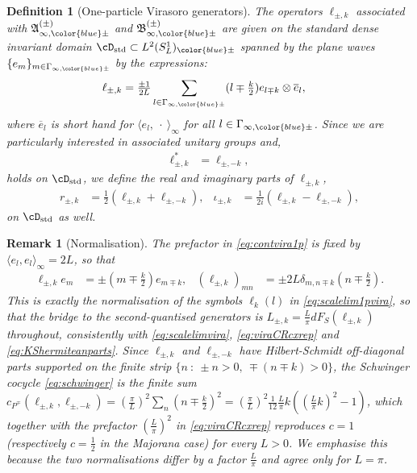 \documentclass[a4paper, 11pt]{article}
\newcommand{\fA}{\mathfrak{A}}\newcommand{\cA}{\mathcal{A}}\newcommand{\dA}{\mathds{A}}\newcommand{\sA}{\mathscr{A}}
\newcommand{\fB}{\mathfrak{B}}\newcommand{\cB}{\mathcal{B}}\newcommand{\dB}{\mathds{B}}\newcommand{\sB}{\mathscr{B}}
\DeclareMathOperator{\1}{\mathds{1}}
\DeclareMathOperator{\std}{std}
\newtheorem{defn}[thm]{Definition}
\newtheorem{rem}[thm]{Remark}
\begin{document}
\begin{defn}[One-particle Virasoro generators]
\label{def:vir}
The operators $\ell_{\pm,k}$ associated with $\fA^{(\pm)}_{\infty,{\color{blue}\pm}}$ and $\fB^{(\pm)}_{\infty,{\color{blue}\pm}}$ are given on the standard dense invariant domain $\cD_{\std}\subset L^{2}(S^{1}_{L})_{{\color{blue}\pm}}$ spanned by the plane waves $\{e_{m}\}_{m\in\Gamma_{\infty,{\color{blue}\pm}}}$ by the expressions:
\begin{align}
\label{eq:contvira1p}
\ell_{\pm,k} & = \tfrac{\pm1}{2L}\sum_{l\in\Gamma_{\infty,{\color{blue}\pm}}}(l\mp\tfrac{k}{2})e_{l\mp k}\otimes \overline{e}_{l},
\end{align}
where $\overline{e}_{l}$ is short hand for $\langle e_{l},\!\ \cdot\!\ \rangle_{\infty}$ for all $l\in\Gamma_{\infty,{\color{blue}\pm}}$. Since we are particularly interested in associated unitary groups and,
\begin{align}
\label{eq:contvira1pad}
\ell_{\pm,k}^{*} & = \ell_{\pm,-k},
\end{align}
holds on $\cD_{\std}$, we define the real and imaginary parts of $\ell_{\pm,k}$,
\begin{align}
\label{eq:contvira1pRI}
r_{\pm,k} & = \tfrac{1}{2}(\ell_{\pm,k}+\ell_{\pm,-k}), & \iota_{\pm,k} & = \tfrac{1}{2i}(\ell_{\pm,k}-\ell_{\pm,-k}),
\end{align}
on $\cD_{\std}$ as well.
\end{defn}

\begin{rem}[Normalisation]
\label{rem:normalisation}
The prefactor in \eqref{eq:contvira1p} is fixed by $\langle e_{l},e_{l}\rangle_{\infty}=2L$, so that
\begin{align}
\label{eq:normalisationaction}
\ell_{\pm,k}e_{m} & = \pm(m\mp\tfrac{k}{2})e_{m\mp k}, & (\ell_{\pm,k})_{mn} & = \pm2L\delta_{m,n\mp k}(n\mp\tfrac{k}{2}).
\end{align}
This is exactly the normalisation of the symbols $\ell_{k}(l)$ in \eqref{eq:scalelim1pvira}, so that the bridge to the second-quantised generators is $L_{\pm,k} = \tfrac{L}{\pi}dF_{S}(\ell_{\pm,k})$ throughout, consistently with \eqref{eq:scalelimvira}, \eqref{eq:viraCRcxrep} and \eqref{eq:KShermiteanparts}. Since $\ell_{\pm,k}$ and $\ell_{\pm,-k}$ have Hilbert-Schmidt off-diagonal parts supported on the finite strip $\{n\!\ :\!\ \pm n>0,\ \mp(n\mp k)>0\}$, the Schwinger cocycle \eqref{eq:schwinger} is the finite sum $c_{P^{\mp}}(\ell_{\pm,k},\ell_{\pm,-k}) = (\tfrac{\pi}{L})^{2}\sum_{n}(n\mp\tfrac{k}{2})^{2} = (\tfrac{\pi}{L})^{2}\tfrac{1}{12}\tfrac{L}{\pi}k((\tfrac{L}{\pi}k)^{2}-1)$, which together with the prefactor $(\tfrac{L}{\pi})^{2}$ in \eqref{eq:viraCRcxrep} reproduces $c=1$ (respectively $c=\tfrac{1}{2}$ in the Majorana case) for every $L>0$. We emphasise this because the two normalisations differ by a factor $\tfrac{L}{\pi}$ and agree only for $L=\pi$.
\end{rem}
\end{document}
